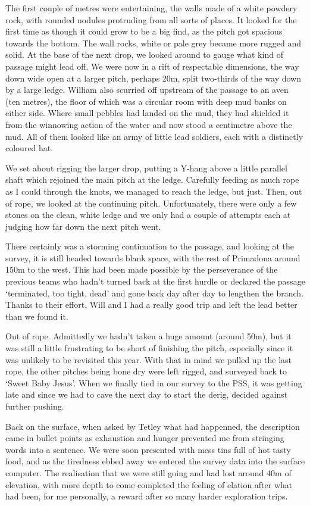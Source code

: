 The first couple of metres were entertaining, the walls made of a white powdery rock, with rounded nodules protruding from all sorts of places. It looked for the first time as though it could grow to be a big find, as the pitch got spacious towards the bottom. The wall rocks, white or pale grey became more rugged and solid. At the base of the next drop, we looked around to gauge what kind of passage might lead off. We were now in a rift of respectable dimensions, the way down wide open at a larger pitch, perhaps 20m, split two-thirds of the way down by a large ledge. William also scurried off upstream of the passage to an aven (ten metres), the floor of which was a circular room with deep mud banks on either side. Where small pebbles had landed on the mud, they had shielded it from the winnowing action of the water and now stood a centimetre above the mud. All of them looked like an army of little lead soldiers, each with a distinctly coloured hat.

We set about rigging the larger drop, putting a Y-hang above a little parallel shaft which rejoined the main pitch at the ledge. Carefully feeding as much rope as I could through the knots, we managed to reach the ledge, but just. Then, out of rope, we looked at the continuing pitch. Unfortunately, there were only a few stones on the clean, white ledge and we only had a couple of attempts each at judging how far down the next pitch went. 

There certainly was a storming continuation to the passage, and looking at the survey, it is still headed towards blank space, with the rest of Primadona around 150m to the west. This had been made possible by the perseverance of the previous teams who hadn’t turned back at the first hurdle or declared the passage ‘terminated, too tight, dead’ and gone back day after day to lengthen the branch.  Thanks to their effort, Will and I had  a really good trip and left the lead better than we found it. 

Out of rope. Admittedly we hadn’t taken a huge amount (around 50m), but it was still a little frustrating to be short of finishing the pitch, especially since it was unlikely to be revisited this year.  With that in mind we pulled up the last rope, the other pitches being bone dry were left rigged, and surveyed back to ‘Sweet Baby Jesus’. When we  finally tied in our survey to the PSS, it was getting late and since we had to cave the next day to start the derig, decided against further pushing. 

Back on the surface, when asked by Tetley what had happenned, the description came in bullet points as exhaustion and hunger prevented me from stringing words into a sentence. We were soon presented with mess tins full of hot tasty food, and as the tiredness ebbed away we entered the survey data into the surface computer. The realisation that we were still going and had lost around 40m of elevation, with more depth to come completed the feeling of elation after what had been, for me personally, a reward after so many harder exploration trips.
